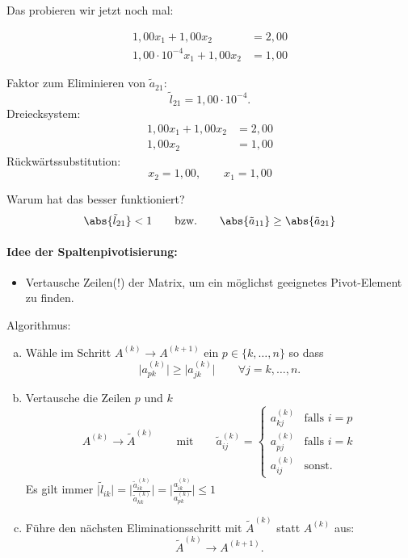 Das probieren wir jetzt noch mal:

\begin{align*}
1{,}00 x_1 + 1{,}00x_2 & = 2{,}00 \\
1{,}00 \cdot 10^{-4} x_1 + 1{,}00x_2 & = 1{,}00
\end{align*}

Faktor zum Eliminieren von $\tilde{a}_{21}$:
\begin{equation*}
 \tilde{l}_{21} = 1{,}00 \cdot 10^{-4}.
\end{equation*}
Dreiecksystem:
\begin{align*}
1{,}00 x_1 + 1{,}00x_2 & = 2{,}00 \\
 1{,}00x_2 & = 1{,}00
\end{align*}
Rückwärtssubstitution:
\begin{equation*}
 x_2 = 1{,}00,
 \qquad
 x_1 = 1{,}00
\end{equation*}

Warum hat das besser funktioniert?
\begin{equation*}
 \abs{\tilde{l}_{21}} < 1
 \qquad \text{bzw.} \qquad
 \abs{\tilde{a}_{11}} \ge \abs{\tilde{a}_{21}}
\end{equation*}



\bigskip

\paragraph{Idee der Spaltenpivotisierung:}
\begin{itemize}
\item Vertausche Zeilen(!) der Matrix, um ein möglichst geeignetes Pivot-Element zu finden.
\end{itemize}
Algorithmus:
\begin{enumerate}[a)]
\item Wähle im Schritt $A^{(k)} \rightarrow A^{(k+1)}$ ein $p \in \{ k, \dots, n \}$ so dass
\begin{equation*}
\Big\vert a_{pk}^{(k)} \Big\vert \ge \Big\vert a_{jk}^{(k)} \Big\vert
\qquad
\forall j = k, \dots, n.
\end{equation*}
\item Vertausche die Zeilen $p$ und $k$
\begin{equation*}
A^{(k)} \rightarrow \tilde{A}^{(k)}
\qquad \text{mit} \qquad
\tilde{a}_{ij}^{(k)} =
\begin{cases}
a_{kj}^{(k)} & \text{falls $i = p$} \\
a_{pj}^{(k)} & \text{falls $i = k$} \\
a_{ij}^{(k)} & \text{sonst}.
\end{cases}
\end{equation*}
Es gilt immer $\displaystyle \vert \tilde{l}_{ik} \vert = \bigg\vert \frac{\tilde{a}_{ik}^{(k)}}{\tilde{a}_{kk}^{(k)}}\bigg\vert = \bigg\vert \frac{a_{ik}^{(k)}}{a_{pk}^{(k)}}\bigg\vert \le 1$
\item Führe den nächsten Eliminationsschritt mit $\tilde{A}^{(k)}$ statt $A^{(k)}$ aus:
\begin{equation*}
\tilde{A}^{(k)} \rightarrow A^{(k+1)}.
\end{equation*}
\end{enumerate}

